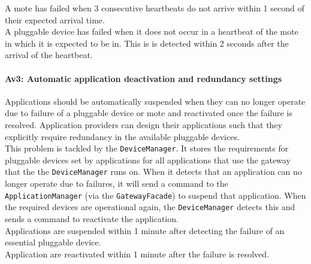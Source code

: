             A mote has failed when 3 consecutive heartbeats do not arrive within 1
            second of their expected arrival time. \\
            A pluggable device has failed when it does not occur in a heartbeat of the
            mote in which it is expected to be in. This is is detected within 2
            seconds after the arrival of the heartbeat.
            
        \paragraph{Av3: Automatic application deactivation and redundancy settings}
            Applications should be automatically suspended when they can no longer
            operate due to failure of a pluggable device or mote and reactivated
            once the failure is resolved. Application providers can design their
            applications such that they explicitly require redundancy in
            the available pluggable devices. \\
            This problem is tackled by the \texttt{DeviceManager}. It
            stores the requirements for pluggable devices set by applications for all
            applications that use the gateway that the the \texttt{DeviceManager}
            runs on. When it detects that an application can no longer operate
            due to failures, it will send a command to the \texttt{ApplicationManager}
            (via the \texttt{GatewayFacade})
            to suspend that application. When the required devices are operational
            again, the \texttt{DeviceManager} detects this and sends a
            command to reactivate the application. \\

            Applications are suspended within 1 minute after detecting
            the failure of an essential pluggable device. \\
            Application are reactivated within 1 minute after the failure is resolved.

